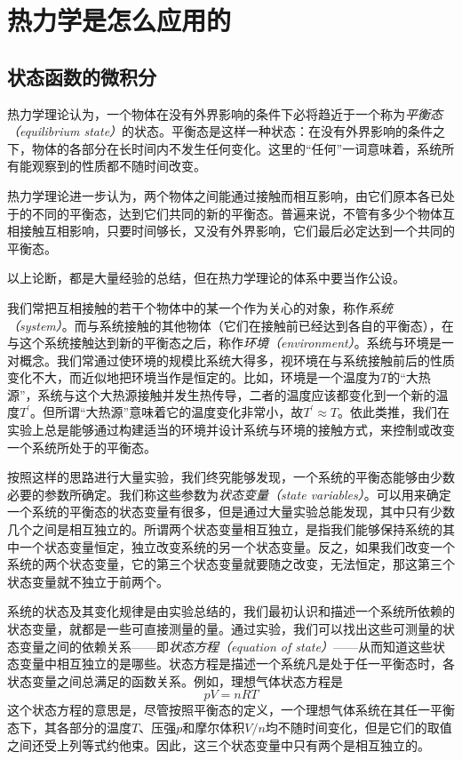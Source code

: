 \documentclass[main.tex]{subfiles}
\begin{document}
\section[热力学是怎么应用的]{热力学是怎么应用的\protect\footnotemark}\label{I.2 pratical_thermodynamics}
\subsection{状态函数的微积分}
热力学理论认为，一个物体在没有外界影响的条件下必将趋近于一个称为\emph{平衡态（equilibrium state）}的状态。平衡态是这样一种状态：在没有外界影响的条件之下，物体的各部分在长时间内不发生任何变化。这里的“任何”一词意味着，系统所有能观察到的性质都不随时间改变。

热力学理论进一步认为，两个物体之间能通过接触而相互影响，由它们原本各已处于的不同的平衡态，达到它们共同的新的平衡态。普遍来说，不管有多少个物体互相接触互相影响，只要时间够长，又没有外界影响，它们最后必定达到一个共同的平衡态。

以上论断，都是大量经验的总结，但在热力学理论的体系中要当作公设。

我们常把互相接触的若干个物体中的某一个作为关心的对象，称作\emph{系统（system）}。而与系统接触的其他物体（它们在接触前已经达到各自的平衡态），在与这个系统接触达到新的平衡态之后，称作\emph{环境（environment）}。系统与环境是一对概念。我们常通过使环境的规模比系统大得多，视环境在与系统接触前后的性质变化不大，而近似地把环境当作是恒定的。比如，环境是一个温度为$T$的“大热源”，系统与这个大热源接触并发生热传导，二者的温度应该都变化到一个新的温度$T^\prime$。但所谓“大热源”意味着它的温度变化非常小，故$T^\prime\approx T$。依此类推，我们在实验上总是能够通过构建适当的环境并设计系统与环境的接触方式，来控制或改变一个系统所处于的平衡态。

按照这样的思路进行大量实验，我们终究能够发现，一个系统的平衡态能够由少数必要的参数所确定。我们称这些参数为\emph{状态变量（state variables）}。可以用来确定一个系统的平衡态的状态变量有很多，但是通过大量实验总能发现，其中只有少数几个之间是相互独立的。所谓两个状态变量相互独立，是指我们能够保持系统的其中一个状态变量恒定，独立改变系统的另一个状态变量。反之，如果我们改变一个系统的两个状态变量，它的第三个状态变量就要随之改变，无法恒定，那这第三个状态变量就不独立于前两个。

系统的状态及其变化规律是由实验总结的，我们最初认识和描述一个系统所依赖的状态变量，就都是一些可直接测量的量。通过实验，我们可以找出这些可测量的状态变量之间的依赖关系——即\emph{状态方程（equation of state）}——从而知道这些状态变量中相互独立的是哪些。状态方程是描述一个系统凡是处于任一平衡态时，各状态变量之间总满足的函数关系。例如，理想气体状态方程是
\[pV=nRT\]
这个状态方程的意思是，尽管按照平衡态的定义，一个理想气体系统在其任一平衡态下，其各部分的温度$T$、压强$p$和摩尔体积$V/n$均不随时间变化，但是它们的取值之间还受上列等式约他束。因此，这三个状态变量中只有两个是相互独立的。
\end{document}
